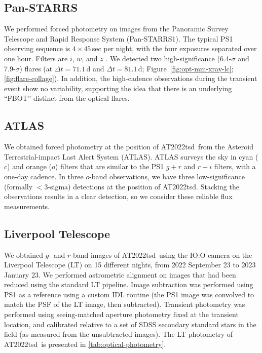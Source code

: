 \documentclass{nature_plusfigure}
\newcommand{\at}{AT2022tsd}
\begin{document}
\begin{methods}
\subsection{Pan-STARRS}
\label{sec:panstarrs}

We performed forced photometry on images from the Panoramic Survey Telescope and Rapid Response System (Pan-STARRS1\cite{Chambers2016}).
The typical PS1 observing sequence is $4\times45$\,sec per night, with the
four exposures separated over one hour. Filters are $i$, $w$, and $z$ \cite{Tonry2012}.
We detected two high-significance (6.4-$\sigma$ and 7.9-$\sigma$) flares (at $\Delta t=71.1$\,d and $\Delta t=81.1\,$d; Figure~\ref{fig:opt-mm-xray-lc}; \ref{fig:flare-collage}).
In addition, the high-cadence observations during the transient event show no variability, supporting the idea that there is an underlying ``FBOT'' distinct from the optical flares.

\subsection{ATLAS}
\label{sec:atlas}

We obtained forced photometry at the position of \at\ from the Asteroid Terrestrial-impact Last Alert System (ATLAS\cite{Tonry2018,Smith2020,Shingles2021}).
ATLAS surveys the sky in cyan ($c$) and orange ($o$) filters that are similar to the PS1 $g+r$ and $r+i$ filters,
with a one-day cadence.
In three $o$-band observations, we have three low-significance (formally $<3$-sigma) detections at the position of \at.
Stacking the observations results in a clear detection, so we consider these reliable flux measurements.

\subsection{Liverpool Telescope}
\label{Methods: LT}

We obtained $g$- and $r$-band images of \at\ using the IO:O camera on the Liverpool Telescope\cite{Steele2004} (LT) on 15 different nights, from 2022 September 23 to 2023 January 23. We performed astrometric alignment on images that had been reduced using the standard LT pipeline.  Image subtraction was performed using PS1 as a reference using a custom IDL routine (the PS1 image was convolved to match the PSF of the LT image, then subtracted).  Transient photometry was performed using seeing-matched aperture photometry fixed at the transient location, and calibrated relative to a set of SDSS secondary standard stars in the field (as measured from the unsubtracted images). The LT photometry of \at\ is presented in \ref{tab:optical-photometry}.


\end{methods}
\end{document}
